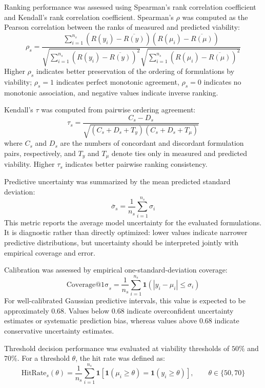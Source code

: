 \documentclass[preprint,12pt]{elsarticle}
\begin{document}
Ranking performance was assessed using Spearman's rank correlation coefficient and Kendall's rank correlation coefficient. Spearman's \(\rho\) was computed as the Pearson correlation between the ranks of measured and predicted viability:
\begin{equation}
\rho_s =
\frac{
\sum_{i=1}^{n_s}
\left(R(y_i)-\overline{R(y)}\right)
\left(R(\mu_i)-\overline{R(\mu)}\right)
}{
\sqrt{
\sum_{i=1}^{n_s}\left(R(y_i)-\overline{R(y)}\right)^2
}
\sqrt{
\sum_{i=1}^{n_s}\left(R(\mu_i)-\overline{R(\mu)}\right)^2
}
}
\end{equation}
Higher \(\rho_s\) indicates better preservation of the ordering of formulations by viability; \(\rho_s=1\) indicates perfect monotonic agreement, \(\rho_s=0\) indicates no monotonic association, and negative values indicate inverse ranking.

Kendall's \(\tau\) was computed from pairwise ordering agreement:
\begin{equation}
\tau_s =
\frac{C_s-D_s}
{\sqrt{(C_s+D_s+T_y)(C_s+D_s+T_\mu)}}
\end{equation}
where \(C_s\) and \(D_s\) are the numbers of concordant and discordant formulation pairs, respectively, and \(T_y\) and \(T_\mu\) denote ties only in measured and predicted viability. Higher \(\tau_s\) indicates better pairwise ranking consistency.

Predictive uncertainty was summarized by the mean predicted standard deviation:
\begin{equation}
\overline{\sigma}_{s}=\frac{1}{n_s}\sum_{i=1}^{n_s}\sigma_i
\end{equation}
This metric reports the average model uncertainty for the evaluated formulations. It is diagnostic rather than directly optimized: lower values indicate narrower predictive distributions, but uncertainty should be interpreted jointly with empirical coverage and error.

Calibration was assessed by empirical one-standard-deviation coverage:
\begin{equation}
\mathrm{Coverage@1\sigma}_{s}
=
\frac{1}{n_s}
\sum_{i=1}^{n_s}
\mathbf{1}\left(|y_i-\mu_i|\leq\sigma_i\right)
\end{equation}
For well-calibrated Gaussian predictive intervals, this value is expected to be approximately \(0.68\). Values below \(0.68\) indicate overconfident uncertainty estimates or systematic prediction bias, whereas values above \(0.68\) indicate conservative uncertainty estimates.

Threshold decision performance was evaluated at viability thresholds of \(50\%\) and \(70\%\). For a threshold \(\theta\), the hit rate was defined as:
\begin{equation}
\mathrm{HitRate}_{s}(\theta)
=
\frac{1}{n_s}
\sum_{i=1}^{n_s}
\mathbf{1}
\left[
\mathbf{1}(\mu_i\geq\theta)
=
\mathbf{1}(y_i\geq\theta)
\right],
\qquad
\theta\in\{50,70\}
\end{equation}
\end{document}
